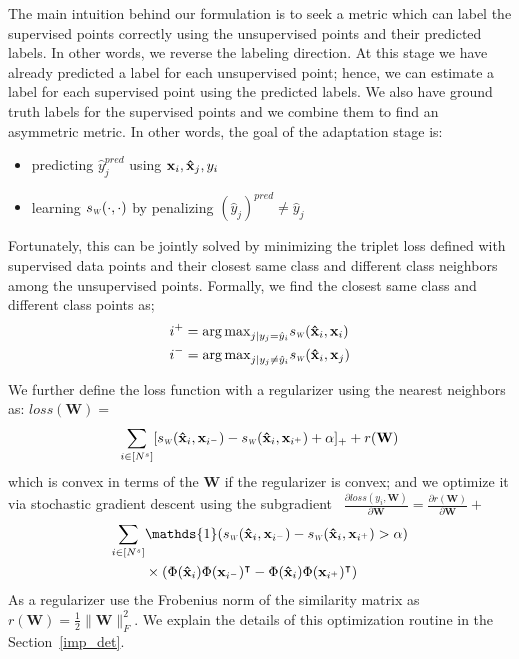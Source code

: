 The main intuition behind our formulation is to seek a metric which can label the supervised points correctly using the unsupervised points and their predicted labels. In other words, we reverse the labeling direction. At this stage we have already predicted a label for each unsupervised point; hence, we can estimate a label for each supervised point using the predicted labels. We also have ground truth labels for the supervised points and we combine them to find an asymmetric metric. In other words, the goal of the adaptation stage is:

\vspace{-3mm}
\begin{itemize}
\item predicting $\hat{y}^{pred}_j$ using $\mathbf{x}_i, \mathbf{\hat{x}}_j, y_i$
\item learning $\sw(\cdot,\cdot)$ by penalizing  $(\hat{y}_j)^{pred} \neq \hat{y}_j$ 
\end{itemize}

Fortunately, this can be jointly solved by minimizing the triplet loss defined with supervised data points and their closest same class and different class neighbors among the unsupervised points. Formally, we find the closest same class and different class points as;
\begin{equation}
\begin{aligned}
&i^{+} = {\arg\max}_{j | y_j = \hat{y}_i} \sw(\xsi, \xui) \\
&i^{-} = {\arg\max}_{j | y_j \neq \hat{y}_i} \sw(\xsi,\xuj) 
\label{sup_nn}
\end{aligned}
\end{equation}

We further define the loss function with a regularizer using the nearest neighbors as: $loss(\mathbf{W})=$
\begin{equation}
 \sum_{i \in [N^s]} [\sw(\mathbf{\hat{x}}_i,\mathbf{x}_{i^-}) - \sw(\mathbf{\hat{x}}_i,\mathbf{x}_{i^+}) + \alpha]_{+} + r(\mathbf{W})
\end{equation}
which is convex in terms of the $\mathbf{W}$ if the regularizer is convex; and we optimize it via stochastic gradient descent using the subgradient \
\mbox{$\frac{\partial loss (y_i, \mathbf{W})}{\partial \mathbf{W}} = \frac{\partial r ( \mathbf{W})}{\partial \mathbf{W}} + $}
\begin{equation}
\begin{aligned}
\sum_{i \in [N^s]} &\mathds{1}(\sw(\xsi,\mathbf{x}_{i^-}) - \sw(\xsi,\mathbf{x}_{i^+})>\alpha) \\
&\times \left( \Phi(\xsi)\Phi(\mathbf{x}_{i^-})^\intercal - \Phi(\xsi)\Phi(\mathbf{x}_{i^+})^\intercal  \right)  
\end{aligned}
\label{gradw}
\end{equation}
As a regularizer use the Frobenius norm of the similarity matrix as $r(\mathbf{W})=\frac{1}{2}\|\mathbf{W}\|_F^2$. We explain the details of this optimization routine in the Section~\ref{imp_det}.
